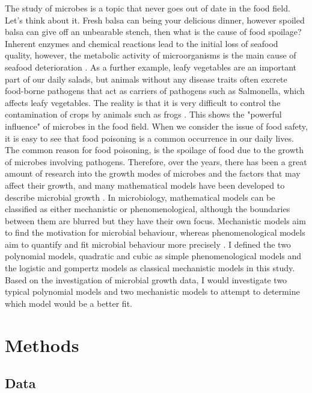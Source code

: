 \documentclass[11pt]{article}
\begin{document}
\begin{linenumbers}
    The study of microbes is a topic that never goes out of date in the food field. Let's think about it. Fresh balsa can being your delicious dinner, however spoiled balsa can give off an unbearable stench, then what is the cause of food spoilage? Inherent enzymes and chemical reactions lead to the initial loss of seafood quality, however, the metabolic activity of microorganisms is the main cause of seafood deterioration \cite{sriket2014proteases}. As a further example, leafy vegetables are an important part of our daily salads, but animals without any disease traits often excrete food-borne pathogens that act as carriers of pathogens such as Salmonella, which affects leafy vegetables. The reality is that it is very difficult to control the contamination of crops by animals such as frogs \cite{gil2015pre}. This shows the "powerful influence" of microbes in the food field. When we consider the issue of food safety, it is easy to see that food poisoning is a common occurrence in our daily lives. The common reason for food poisoning, is the spoilage of food due to the growth of microbes involving pathogens. Therefore, over the years, there has been a great amount of research into the growth modes of microbes and the factors that may affect their growth, and many mathematical models have been developed to describe microbial growth \cite{peleg2011microbial}. In microbiology, mathematical models can be classified as either mechanistic or phenomenological, although the boundaries between them are blurred but they have their own focus. Mechanistic models aim to find the motivation for microbial behaviour, whereas phenomenological models aim to quantify and fit microbial behaviour more precisely \cite{ferrer2009mathematical}.
    I defined the two polynomial models, quadratic and cubic as simple phenomenological models and the logistic and gompertz models as classical mechanistic models in this study. Based on the investigation of microbial growth data, I would investigate two typical polynomial models and two mechanistic models to attempt to determine which model would be a better fit.

    \section{Methods}
     
      \subsection{Data}


\end{linenumbers}
\end{document}
